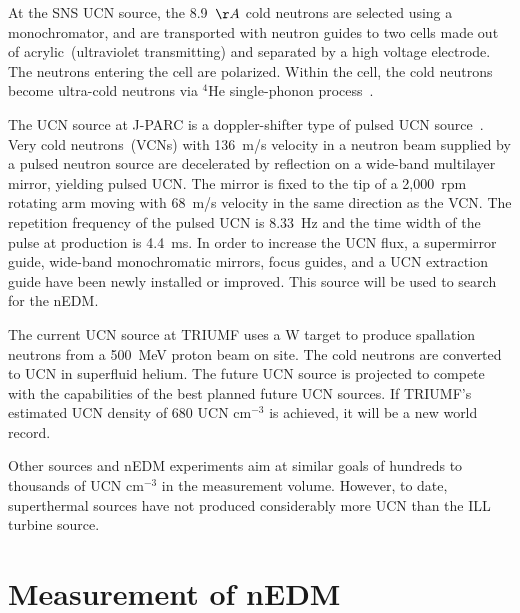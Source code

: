 At the SNS UCN source, the 8.9~$\AA$ cold neutrons are selected using
a monochromator, and are transported with neutron guides to two cells
made out of acrylic~(ultraviolet transmitting) and separated by a high
voltage electrode.  The neutrons entering the cell are
polarized. Within the cell, the cold neutrons become ultra-cold
neutrons via $^4$He single-phonon process~\cite{kolarkar2010}.


The UCN source at J-PARC is a doppler-shifter type of pulsed UCN
source~\cite{Imajo2015}. Very cold neutrons~(VCNs) with 136~m/s
velocity in a neutron beam supplied by a pulsed neutron source are
decelerated by reflection on a wide-band multilayer mirror, yielding
pulsed UCN. The mirror is fixed to the tip of a 2,000~rpm rotating arm
moving with 68~m/s velocity in the same direction as the VCN. The
repetition frequency of the pulsed UCN is 8.33~Hz and the time width
of the pulse at production is 4.4~ms. In order to increase the UCN
flux, a supermirror guide, wide-band monochromatic mirrors, focus
guides, and a UCN extraction guide have been newly installed or
improved. This source will be used to search for the nEDM.


The current UCN source at TRIUMF uses a W target to produce spallation
neutrons from a 500~MeV proton beam on site. The cold neutrons are
converted to UCN in superfluid helium.  The future UCN source is
projected to compete with the capabilities of the best planned future
UCN sources. If TRIUMF's estimated UCN density of 680 UCN cm$^{-3}$ is
achieved, it will be a new world record.

Other sources and nEDM experiments aim at similar goals of hundreds to
thousands of UCN cm$^{-3}$ in the measurement volume. However, to
date, superthermal sources have not produced considerably more UCN
than the ILL turbine source.


 





\section{Measurement of nEDM}

